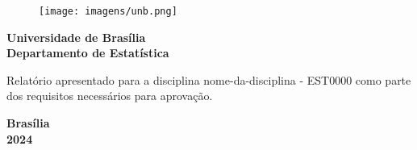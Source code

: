 \begin{titlepage}
\begin{center}
\begin{figure}[h!]
	\centering
		\texttt{[image: imagens/unb.png]}
	\label{fig:unb}
\end{figure}
{\bf \large Universidade de Brasília \\
\bf Departamento de Estatística}
\vspace{5cm}

\setcounter{page}{0}
\null
\textbf{\titulo}
\vspace{2.5cm}


\vspace{0.2cm}
\textbf{\autor}
\end{center}
\vspace{1.5cm}

\begin{flushright}
\begin{minipage}{7.5cm}
\parbox[t]{7.5cm}{Relatório apresentado para a disciplina nome-da-disciplina - EST0000 como parte dos requisitos necessários para aprovação.}
\end{minipage}
\end{flushright}

\vspace{5cm}

\begin{center}
{\bf{Brasília} \\ }
\bf{2024}
\end{center}

\end{titlepage}
